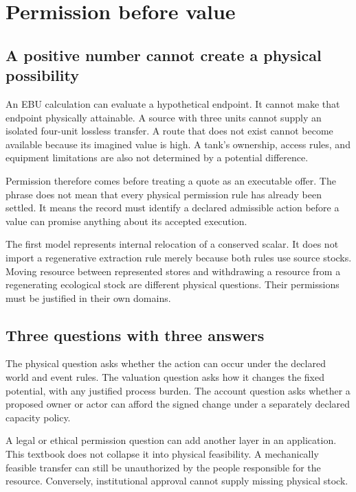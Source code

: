 \chapter{Permission before value}\label{ch:permission}

\section{A positive number cannot create a physical possibility}
An EBU calculation can evaluate a hypothetical endpoint. It cannot make that endpoint physically attainable. A source with three units cannot supply an isolated four-unit lossless transfer. A route that does not exist cannot become available because its imagined value is high. A tank's ownership, access rules, and equipment limitations are also not determined by a potential difference.

Permission therefore comes before treating a quote as an executable offer. The phrase does not mean that every physical permission rule has already been settled. It means the record must identify a declared admissible action before a value can promise anything about its accepted execution.

The first model represents internal relocation of a conserved scalar. It does not import a regenerative extraction rule merely because both rules use source stocks. Moving resource between represented stores and withdrawing a resource from a regenerating ecological stock are different physical questions. Their permissions must be justified in their own domains.

\section{Three questions with three answers}
The physical question asks whether the action can occur under the declared world and event rules. The valuation question asks how it changes the fixed potential, with any justified process burden. The account question asks whether a proposed owner or actor can afford the signed change under a separately declared capacity policy.

A legal or ethical permission question can add another layer in an application. This textbook does not collapse it into physical feasibility. A mechanically feasible transfer can still be unauthorized by the people responsible for the resource. Conversely, institutional approval cannot supply missing physical stock.

